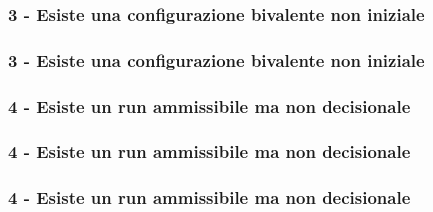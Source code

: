\documentclass{beamer}
\begin{document}
\begin{frame}\frametitle{3 - Esiste una configurazione bivalente non iniziale}
\begin{center}\color{black}{$e=(p,m)$ ed $e'=(p,m')$}\end{center}
\begin{figure}\centering\end{figure}
\begin{center}\color{white}{assurdo se $p=p'$}\end{center}
\end{frame}


\begin{frame}\frametitle{3 - Esiste una configurazione bivalente non iniziale}
\begin{center}\color{black}{$e=(p,m)$ ed $e'=(p,m')$}\end{center}
\begin{figure}\centering\end{figure}
\begin{center}\color{black}{assurdo per $\sigma$ decisionale}\end{center}
\end{frame}

\begin{frame}\frametitle{4 - Esiste un run ammissibile ma non decisionale}
\begin{figure}\centering\end{figure}
\begin{center}\color{white}{$C_\beta$ bivalente}\end{center}
\end{frame}


\begin{frame}\frametitle{4 - Esiste un run ammissibile ma non decisionale}
\begin{figure}\centering\end{figure}
\begin{center}\color{white}{$C_\beta$ bivalente}\end{center}
\end{frame}

\begin{frame}\frametitle{4 - Esiste un run ammissibile ma non decisionale}
\begin{figure}\centering\end{figure}
\begin{center}\color{white}{$C_\beta$ bivalente}\end{center}
\end{frame}
\end{document}
